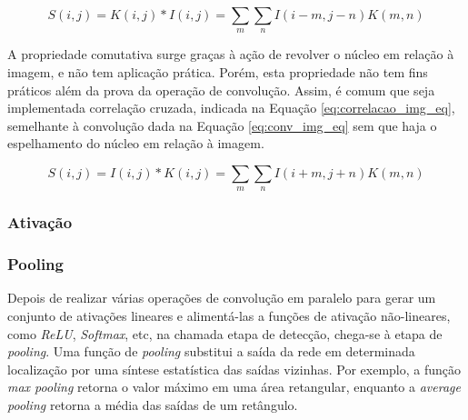 \begin{equation}\label{eq:conv_img_eq}
	S(i,j) = K(i,j)*I(i,j) = \sum_{m}\sum_{n}I(i-m,j-n)K(m,n)
\end{equation}

A propriedade comutativa surge graças à ação de revolver o núcleo em relação à imagem, e não tem aplicação prática. Porém, esta propriedade não tem fins práticos além da prova da operação de convolução. Assim, é comum que seja implementada correlação cruzada, indicada na Equação \ref{eq:correlacao_img_eq}, semelhante à convolução dada na Equação \ref{eq:conv_img_eq} sem que haja o espelhamento do núcleo em relação à imagem.

\begin{equation}\label{eq:correlacao_img_eq}
	S(i,j) = I(i,j)*K(i,j) = \sum_{m}\sum_{n}I(i+m,j+n)K(m,n)
\end{equation}

\subsubsection{Ativação}


\subsubsection{Pooling}

Depois de realizar várias operações de convolução em paralelo para gerar um conjunto de ativações lineares e alimentá-las a funções de ativação não-lineares, como \emph{ReLU}, \emph{Softmax}, etc, na chamada etapa de detecção, chega-se à etapa de \emph{pooling}. Uma função de \emph{pooling} substitui a saída da rede em determinada localização por uma síntese estatística das saídas vizinhas. Por exemplo, a função \emph{max pooling} retorna o valor máximo em uma área retangular, enquanto a \emph{average pooling} retorna a média das saídas de um retângulo. %
